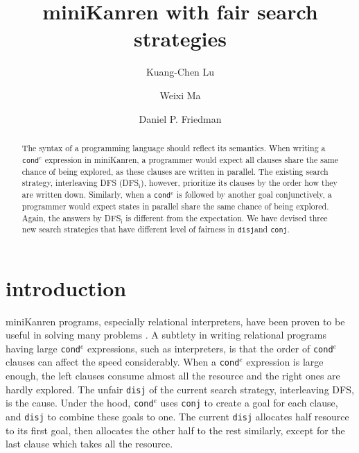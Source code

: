 \documentclass[format=acmlarge, review=true, authordraft=true]{acmart}
\title{miniKanren with fair search strategies}
\author{Kuang-Chen Lu}
\affiliation{Indiana University}
\author{Weixi Ma}
\affiliation{Indiana University}
\author{Daniel P. Friedman}
\affiliation{Indiana University}
\newcommand{\conde}{\texttt{cond$^e$} }
\newcommand{\conj}{\texttt{conj}}
\newcommand{\disj}{\texttt{disj}}
\begin{document}
\begin{abstract}

The syntax of a programming language should reflect its semantics. When writing 
a \conde expression in miniKanren, a programmer would expect all clauses share 
the same chance of being explored, as these clauses are written in 
parallel. The existing search strategy, interleaving DFS (DFS$_\textrm{i}$), however, 
prioritize its clauses by the order how they are written down. Similarly, when 
a \conde is followed by another goal conjunctively, a programmer would expect 
states in parallel share the same chance of being explored. Again, the answers 
by DFS$_\textrm{i}$ is different from the expectation. We have devised three new search 
strategies that have different level of fairness in \disj and \conj.


\end{abstract}

\maketitle

\section{introduction}

miniKanren programs, especially relational interpreters, have been proven to be 
useful in solving many problems \citep{byrd2017unified}. A subtlety in writing 
relational programs having large \conde expressions, such as interpreters, is 
that the order of \conde clauses can affect the speed considerably. When a 
\conde expression is large enough, the left clauses consume almost all the 
resource and the right ones are hardly explored. The unfair \disj{} of the 
current search strategy, interleaving DFS, is the cause. Under the hood, \conde 
uses \texttt{conj} to create a goal for each clause, and \texttt{disj} to 
combine these goals to one. The current \texttt{disj} allocates half resource 
to its first goal, then allocates the other half to the rest similarly, except 
for the last clause which takes all the resource. 
\end{document}
